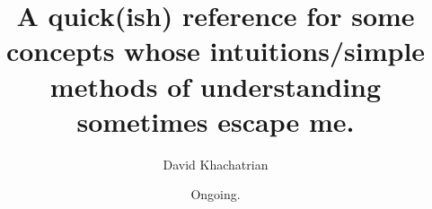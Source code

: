 \documentclass[letterpaper,12pt]{report}
\begin{document}
\title{A quick(ish) reference for some concepts whose
 intuitions/simple methods of understanding sometimes escape me.}
\author{David Khachatrian}
\date{Ongoing.}

\maketitle

\newpage


\tableofcontents

\newpage























% 







    
    



      \clearpage %
    \printindex %
    
\end{document}
